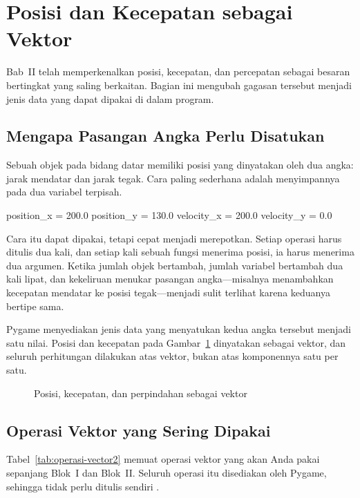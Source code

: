 \section{Posisi dan Kecepatan sebagai Vektor}
\label{sec:posisi-vektor}

Bab~II telah memperkenalkan posisi, kecepatan, dan percepatan sebagai besaran
bertingkat yang saling berkaitan. Bagian ini mengubah gagasan tersebut menjadi
jenis data yang dapat dipakai di dalam program.

\subsection{Mengapa Pasangan Angka Perlu Disatukan}

Sebuah objek pada bidang datar memiliki posisi yang dinyatakan oleh dua angka:
jarak mendatar dan jarak tegak. Cara paling sederhana adalah menyimpannya
pada dua variabel terpisah.

\begin{kodekeluaran}
position_x = 200.0
position_y = 130.0
velocity_x = 200.0
velocity_y = 0.0
\end{kodekeluaran}

Cara itu dapat dipakai, tetapi cepat menjadi merepotkan. Setiap operasi harus
ditulis dua kali, dan setiap kali sebuah fungsi menerima posisi, ia harus
menerima dua argumen. Ketika jumlah objek bertambah, jumlah variabel bertambah
dua kali lipat, dan kekeliruan menukar pasangan angka---misalnya menambahkan
kecepatan mendatar ke posisi tegak---menjadi sulit terlihat karena keduanya
bertipe sama.

Pygame menyediakan jenis data  yang menyatukan kedua
angka tersebut menjadi satu nilai. Posisi dan kecepatan pada
Gambar~\ref{fig:vektor-kecepatan} dinyatakan sebagai vektor, dan seluruh
perhitungan dilakukan atas vektor, bukan atas komponennya satu per satu.

\begin{figure}[htbp]
\centering

\caption{Posisi, kecepatan, dan perpindahan sebagai vektor}
\label{fig:vektor-kecepatan}
\end{figure}

\subsection{Operasi Vektor yang Sering Dipakai}

Tabel~\ref{tab:operasi-vector2} memuat operasi vektor yang akan Anda pakai
sepanjang Blok~I dan Blok~II. Seluruh operasi itu disediakan oleh Pygame,
sehingga tidak perlu ditulis sendiri \cite{pygame-docs}.

